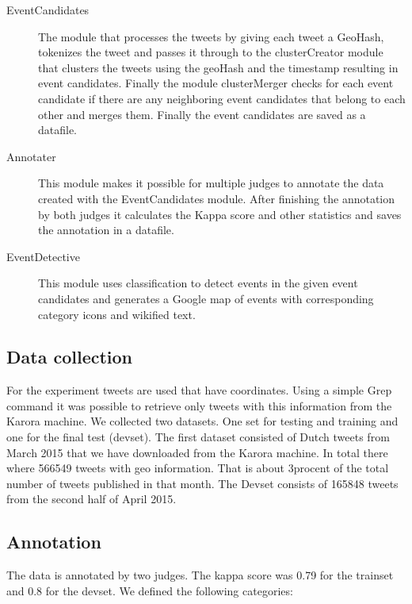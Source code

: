 \documentclass[
10pt, %
a4paper, %
oneside, %
headinclude,footinclude, %
BCOR5mm, %
]{scrartcl}
\begin{document}
\begin{description}

\item[EventCandidates] 
The module that processes the tweets by giving each tweet a GeoHash, tokenizes the tweet and passes it through to the clusterCreator module that clusters the tweets using the geoHash and the timestamp resulting in event candidates. Finally the module clusterMerger checks for each event candidate if there are any neighboring event candidates that belong to each other and merges them. Finally the event candidates are saved as a datafile.


\item[Annotater] 
This module makes it possible for multiple judges to annotate the data created with the EventCandidates module. After finishing the annotation by both judges it calculates the Kappa score and other statistics and saves the annotation in a datafile.


\item[EventDetective] 
This module uses classification to detect events in the given event candidates and generates a Google map of events with corresponding category icons and wikified text.


\end{description}

\subsection{Data collection}
For the experiment tweets are used that have coordinates. Using a simple Grep command it was possible to retrieve only tweets with this information from the Karora machine. We collected two datasets. One set for testing and training and one for the final test (devset). 
The first dataset consisted of Dutch tweets from March 2015 that we have downloaded from the Karora machine. In total there where 566549 tweets with geo information. That is about 3procent of the total number of tweets published in that month. The Devset consists of 165848 tweets from the second half of April 2015.

\subsection{Annotation}
The data is annotated by two judges. The kappa score was 0.79 for the trainset and 0.8 for the devset. We defined the following categories:
\end{document}
